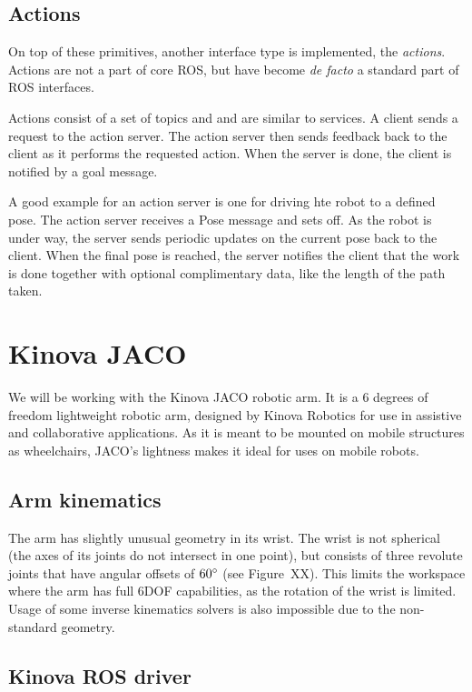 \documentclass[buriama8_dp.tex]{subfiles}
\begin{document}
\subsection{Actions}
\label{subsec:ros_actions}

On top of these primitives, another interface type is implemented, the \emph{actions}. Actions are not a part of core ROS, but have become \emph{de facto} a standard part of ROS interfaces. 

 Actions consist of a set of topics and and are similar to services. A client sends a request to the action server. The action server then sends feedback back to the client as it performs the requested action. When the server is done, the client is notified by a goal message.

A good example for an action server is one for driving hte robot to a defined pose. The action server receives a Pose message and sets off. As the robot is under way, the server sends periodic updates on the current pose back to the client. When the final pose is reached, the server notifies the client that the work is done together with optional complimentary data, like the length of the path taken.


\section{Kinova JACO}
We will be working with the Kinova JACO robotic arm. It is a 6 degrees of freedom lightweight robotic arm, designed by Kinova Robotics for use in assistive and collaborative applications. As it is meant to be mounted on mobile structures as wheelchairs, JACO's lightness makes it ideal for uses on mobile robots.

\subsection{Arm kinematics}
\label{subsec:arm_kinematics}

The arm has slightly unusual geometry in its wrist. The wrist is not spherical (the axes of its joints do not intersect in one point), but consists of three revolute joints that have angular offsets of \(60^\circ\) (see Figure~XX). This limits the workspace where the arm has full 6DOF capabilities, as the rotation of the wrist is limited. Usage of some inverse kinematics solvers is also impossible due to the non-standard geometry.

\subsection{Kinova ROS driver}
\label{subsec:kinova_ros}
\end{document}
